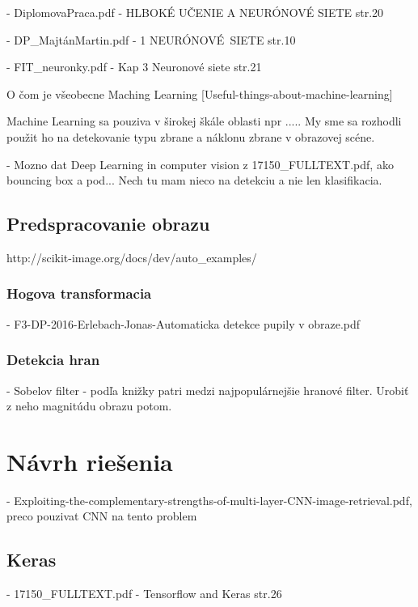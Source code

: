 - DiplomovaPraca.pdf - HLBOKÉ UČENIE A NEURÓNOVÉ SIETE str.20

- DP\_MajtánMartin.pdf - 1 NEURÓNOVÉ\ SIETE str.10

- FIT\_neuronky.pdf - Kap 3 Neuronové siete str.21

O čom je všeobecne Maching Learning
[Useful-things-about-machine-learning]

Machine Learning sa pouziva v širokej škále oblasti npr .....
My sme sa rozhodli použit ho na detekovanie typu zbrane a náklonu zbrane v obrazovej scéne.




- Mozno dat Deep Learning in computer vision z 17150\_FULLTEXT.pdf, ako bouncing box a pod...
Nech tu mam nieco na detekciu a nie len klasifikacia.

\section{Predspracovanie obrazu}
http://scikit-image.org/docs/dev/auto\_examples/

\subsection{Hogova transformacia}
- F3-DP-2016-Erlebach-Jonas-Automaticka detekce pupily v obraze.pdf

\subsection{Detekcia hran}

- Sobelov filter - podľa knižky patri medzi najpopulárnejšie hranové filter.
Urobiť z neho magnitúdu obrazu potom.

\chapter{Návrh riešenia}

- Exploiting-the-complementary-strengths-of-multi-layer-CNN-image-retrieval.pdf,
preco pouzivat CNN na tento problem

\section{Keras}
- 17150\_FULLTEXT.pdf - Tensorflow and Keras str.26

